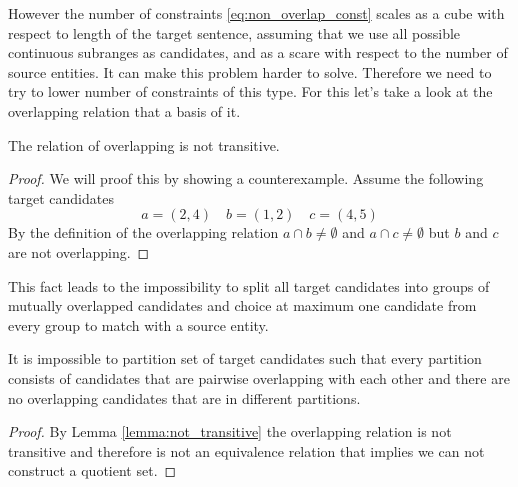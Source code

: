 However the number of constraints \eqref{eq:non_overlap_const} scales as a cube with respect to
length of the target sentence, assuming that we use all possible continuous subranges as candidates, and as
a scare with respect to the number of source entities.
It can make this problem harder to solve. Therefore we need to try to lower number of constraints
of this type. For this let's take a look at the overlapping relation that a basis of it.
\begin{lemma} \label{lemma:not_transitive}
    The relation of overlapping is not transitive.
\end{lemma}
\begin{proof}
    We will proof this by showing a counterexample.
    Assume the following target candidates
    \[
        a = (2, 4) \quad b = (1, 2) \quad c = (4, 5)
    \]
    By the definition of the overlapping relation \( a \cap b \neq \emptyset \) and
    \( a \cap c \neq \emptyset \) but \( b \) and \( c \) are not overlapping.
\end{proof}

This fact leads to the impossibility to split all target candidates into groups of mutually
overlapped candidates and choice at maximum one candidate from every group to match with a source entity.
\begin{corollary}
    It is impossible to partition set of target candidates such that every partition consists of
    candidates that are pairwise overlapping with each other and there are no overlapping candidates
    that are in different partitions.
\end{corollary}
\begin{proof}
    By Lemma \ref{lemma:not_transitive} the overlapping relation is not transitive and therefore
    is not an equivalence relation that implies we can not construct a quotient set.
\end{proof}

